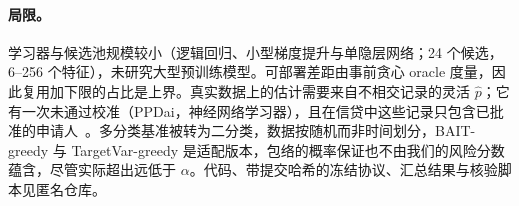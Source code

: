 \documentclass[runningheads]{llncs}
\begin{document}
\paragraph{局限。}学习器与候选池规模较小（逻辑回归、小型梯度提升与单隐层网络；24 个候选，6--256 个特征），未研究大型预训练模型。可部署差距由事前贪心 oracle 度量，因此复用加下限的占比是上界。真实数据上的估计需要来自不相交记录的灵活 $\hat p$；它有一次未通过校准（PPDai，神经网络学习器），且在信贷中这些记录只包含已批准的申请人~\cite{crook2004reject}。多分类基准被转为二分类，数据按随机而非时间划分，BAIT-greedy 与 TargetVar-greedy 是适配版本，包络的概率保证也不由我们的风险分数蕴含，尽管实际超出远低于 $\alpha$。代码、带提交哈希的冻结协议、汇总结果与核验脚本见匿名仓库。



\end{document}
